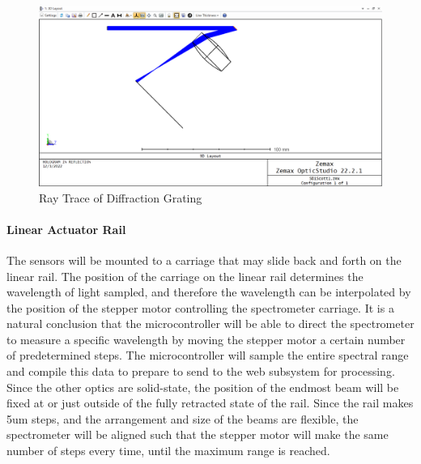 \documentclass[journal]{IEEEtran}
\begin{document}
\begin{figure}[H]
    \caption{Ray Trace of Diffraction Grating}
    \centering
    \includegraphics[width=0.75\linewidth]{images/Zemax Ray Trace.png}
\end{figure}
\paragraph{Linear Actuator Rail} The sensors will be mounted to a carriage that may slide back and forth on the linear rail. The position of the carriage on the linear rail determines the wavelength of light sampled, and therefore the wavelength can be interpolated by the position of the stepper motor controlling the spectrometer carriage. It is a natural conclusion that the microcontroller will be able to direct the spectrometer to measure a specific wavelength by moving the stepper motor a certain number of predetermined steps. The microcontroller will sample the entire spectral range and compile this data to prepare to send to the web subsystem for processing. Since the other optics are solid-state, the position of the endmost beam will be fixed at or just outside of the fully retracted state of the rail. Since the rail makes 5um steps, and the arrangement and size of the beams are flexible, the spectrometer will be aligned such that the stepper motor will make the same number of steps every time, until the maximum range is reached. \break
\end{document}
